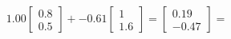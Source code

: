 \documentclass[preview]{standalone}
\begin{document}
\begin{align*}
1.00 \begin{bmatrix} 0.8 \\ 0.5 \end{bmatrix} + -0.61 \begin{bmatrix} 1 \\ 1.6 \end{bmatrix} = \begin{bmatrix} 0.19 \\ -0.47 \end{bmatrix} =
\end{align*}
\end{document}
